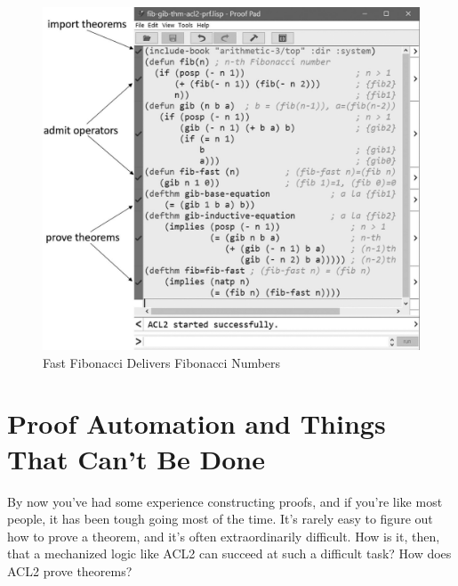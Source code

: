 \begin{figure}
\begin{center}
\includegraphics[scale=1]{images-cmyk/fib-gib-thm-acl2-prf}
\end{center}
\caption{Fast Fibonacci Delivers Fibonacci Numbers}
\label{fig:fib-gib-thm}
\end{figure}

\begin{exercises}


\end{exercises}

\section{Proof Automation and Things That Can't Be Done}
\label{sec:halting-problem}

By now you've had some experience constructing proofs, and if you're like most people,
it has been tough going most of the time.
It's rarely easy to figure out how to prove a theorem,
and it's often extraordinarily difficult.
How is it, then, that a mechanized logic like ACL2 can succeed at such a difficult task?
How does ACL2 prove theorems?

